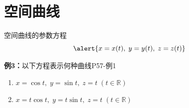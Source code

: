 % 
% 
% 		

\section{空间曲线}

\begin{frame}{空间曲线的参数方程}
	\linespread{1.2}\pause 
	\pause 
% 	
% 	
	$$\alert{x=x(t),\;y=y(t),\;z=z(t)}$$\pause 
	\begin{exampleblock}{{\bf 例3：}以下方程表示何种曲线\hfill P57-例1}\pause 
		\begin{enumerate}
		  \item $x=\cos t,\;y=\sin t,\;z=t\;(t\in\mathbb{R})$\pause 
		  \item $x=t\cos t,\;y=t\sin t,\;z=t\;(t\in\mathbb{R})$ 
		\end{enumerate}
	\end{exampleblock}
\end{frame}

